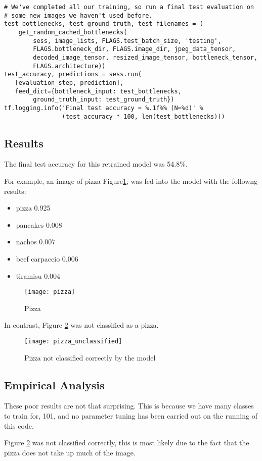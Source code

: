 \begin{lstlisting}
# We've completed all our training, so run a final test evaluation on
# some new images we haven't used before.
test_bottlenecks, test_ground_truth, test_filenames = (
    get_random_cached_bottlenecks(
        sess, image_lists, FLAGS.test_batch_size, 'testing',
        FLAGS.bottleneck_dir, FLAGS.image_dir, jpeg_data_tensor,
        decoded_image_tensor, resized_image_tensor, bottleneck_tensor,
        FLAGS.architecture))
test_accuracy, predictions = sess.run(
   [evaluation_step, prediction],
   feed_dict={bottleneck_input: test_bottlenecks,
        ground_truth_input: test_ground_truth})
tf.logging.info('Final test accuracy = %.1f%% (N=%d)' %
                (test_accuracy * 100, len(test_bottlenecks)))
\end{lstlisting}

\subsection*{Results}
The final test accuracy for this retrained model was 54.8\%.

For example, an image of pizza Figure\ref{fig:pizza}, was fed into the model with the followng results:
\begin{itemize}
    \item{pizza 0.925}
    \item{pancakes 0.008}
    \item{nachos 0.007}
    \item{beef carpaccio 0.006}
    \item{tiramisu 0.004}
\end{itemize}

\begin{figure}
     \texttt{[image: pizza]}
     \caption{Pizza}
     \label{fig:pizza}
\end{figure}

In contrast, Figure \ref{fig:pizza_unclassified} was not classified as a pizza.

\begin{figure}
     \texttt{[image: pizza\_unclassified]}
     \caption{Pizza not classified correctly by the model}
     \label{fig:pizza_unclassified}
\end{figure}

\subsection*{Empirical Analysis}
These poor results are not that surprising.
This is because we have many classes to train for, 101, and no parameter tuning has been carried out on the running of this code.

Figure \ref{fig:pizza_unclassified} was not classified correctly, this is most likely due to the fact that the pizza does not take up much of the image.

